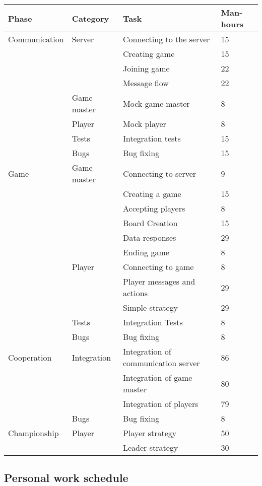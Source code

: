 \documentclass[11pt,a4paper]{article}
\begin{document}
\begin{longtable}{| p{3.5cm} | p{3cm} | p{4cm} | l |} \hline
\textbf{Phase} & \textbf{Category} & \textbf{Task} & \textbf{Man-hours} \\ \hline
Communication & Server & Connecting to the server & 15 \\ \cline{3-4}
& & Creating game & 15 \\ \cline{3-4}
& & Joining game & 22 \\ \cline{3-4}
& & Message flow & 22 \\ \cline{2-4}
& Game master & Mock game master & 8 \\ \cline{2-4}
& Player & Mock player & 8 \\ \cline{2-4}
& Tests & Integration tests & 15 \\ \cline{2-4}
& Bugs & Bug fixing & 15 \\ \hline
Game & Game master & Connecting to server & 9 \\ \cline{3-4}
& & Creating a game & 15 \\ \cline{3-4}
& & Accepting players & 8 \\ \cline{3-4}
& & Board Creation & 15 \\ \cline{3-4}
& & Data responses & 29 \\ \cline{3-4}
& & Ending game & 8 \\ \cline{2-4}
& Player & Connecting to game & 8 \\ \cline{3-4}
& & Player messages and actions & 29 \\ \cline{3-4}
& & Simple strategy & 29 \\ \cline{2-4}
& Tests & Integration Tests & 8 \\ \cline{2-4}
& Bugs & Bug fixing & 8 \\ \hline
Cooperation & Integration & Integration of communication server & 86 \\ \cline{3-4}
& & Integration of game master & 80 \\ \cline{3-4}
& & Integration of players & 79 \\ \cline{2-4}
& Bugs & Bug fixing & 8 \\ \hline
Championship & Player & Player strategy & 50 \\ \cline{3-4}
& & Leader strategy & 30 \\ \hline
\end{longtable}


\subsection{Personal work schedule}
\end{document}
